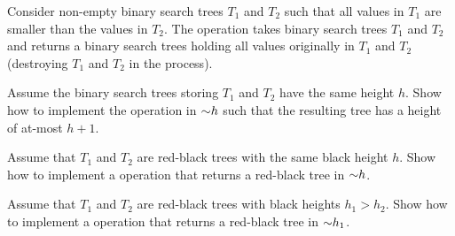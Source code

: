 \begin{problem}
Consider non-empty binary search trees $T_1$ and $T_2$ such that all values in $T_1$ are smaller than the values in $T_2$. The  operation takes binary search trees $T_1$ and $T_2$ and returns a binary search trees holding all values originally in $T_1$ and $T_2$ (destroying $T_1$ and $T_2$ in the process). 
\begin{questions}
\item Assume the binary search trees storing $T_1$ and $T_2$ have the same height $h$. Show how to implement the  operation in $\mathord{\sim}h$ such that the resulting tree has a height of at-most $h+1$.



\item Assume that $T_1$ and $T_2$ are red-black trees with the same black height $h$. Show how to implement a  operation that returns a red-black tree in $\mathord{\sim}h$.



\item Assume that $T_1$ and $T_2$ are red-black trees with black heights $h_1 > h_2$. Show how to implement a  operation that returns a red-black tree in $\mathord{\sim}h_1$.



\end{questions}
\end{problem}



